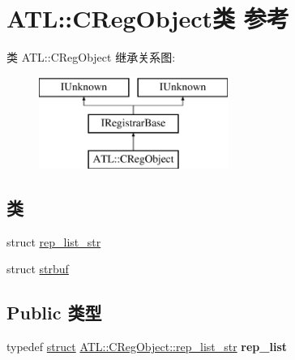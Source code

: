 \hypertarget{class_a_t_l_1_1_c_reg_object}{}\section{A\+TL\+:\+:C\+Reg\+Object类 参考}
\label{class_a_t_l_1_1_c_reg_object}
类 A\+TL\+:\+:C\+Reg\+Object 继承关系图\+:\begin{figure}[H]
\begin{center}
\leavevmode
\includegraphics[height=3.000000cm]{class_a_t_l_1_1_c_reg_object}
\end{center}
\end{figure}
\subsection*{类}
\begin{DoxyCompactItemize}
\item 
struct \hyperlink{struct_a_t_l_1_1_c_reg_object_1_1rep__list__str}{rep\+\_\+list\+\_\+str}
\item 
struct \hyperlink{struct_a_t_l_1_1_c_reg_object_1_1strbuf}{strbuf}
\end{DoxyCompactItemize}
\subsection*{Public 类型}
\begin{DoxyCompactItemize}
\item 
\mbox{\label{class_a_t_l_1_1_c_reg_object_a7fe706ead5c0ff506e71d6619c558eb2}} 
typedef \hyperlink{interfacestruct}{struct} \hyperlink{struct_a_t_l_1_1_c_reg_object_1_1rep__list__str}{A\+T\+L\+::\+C\+Reg\+Object\+::rep\+\_\+list\+\_\+str} {\bfseries rep\+\_\+list}
\end{DoxyCompactItemize}

